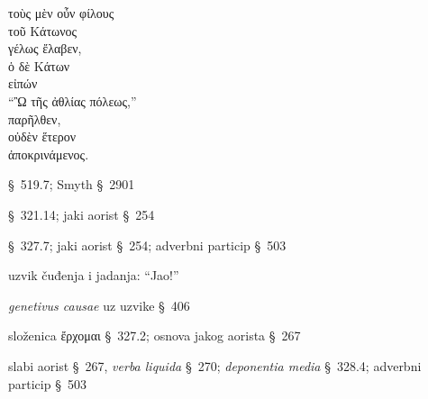 
{\large
\begin{greek}
\noindent τοὺς μὲν οὖν φίλους \\
\tabto{2em} τοῦ Κάτωνος \\
γέλως ἔλαβεν, \\
ὁ δὲ Κάτων \\
\tabto{2em} εἰπών \\
\tabto{4em} ``Ὢ τῆς ἀθλίας πόλεως,''\\
παρῆλθεν, \\
οὐδὲν ἕτερον \\
\tabto{2em} ἀποκρινάμενος. \\

\end{greek}
}

\begin{description}[noitemsep]
\item[μὲν οὖν] §~519.7; Smyth §~2901
\item[ἔλαβεν] §~321.14; jaki aorist §~254
\item[εἰπών] §~327.7; jaki aorist §~254; adverbni particip §~503
\item[Ὢ] uzvik čuđenja i jadanja: ``Jao!''
\item[τῆς ἀθλίας πόλεως] \textit{genetivus causae} uz uzvike §~406
\item[παρῆλθεν] složenica ἔρχομαι §~327.2; osnova jakog aorista §~267
\item[ἀποκρινάμενος] slabi aorist §~267, \textit{verba liquida} §~270; \textit{deponentia media} §~328.4; adverbni particip §~503

\end{description}


